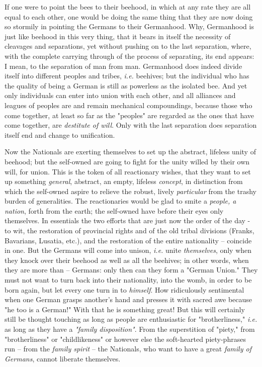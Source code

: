 \documentclass[a4paper]{book}
\begin{document}
If one were to point the bees to their beehood, in which at any rate they are 
all equal to each other, one would be doing the same thing that they are now 
doing so stormily in pointing the Germans to their Germanhood. Why, Germanhood 
is just like beehood in this very thing, that it bears in itself the necessity 
of cleavages and separations, yet without pushing on to the last separation, 
where, with the complete carrying through of the process of separating, its 
end appears: I mean, to the separation of man from man. Germanhood does indeed 
divide itself into different peoples and tribes, \textit{i.e.} beehives; but 
the individual who has the quality of being a German is still as powerless as 
the isolated bee. And yet only individuals can enter into union with each 
other, and all alliances and leagues of peoples are and remain mechanical 
compoundings, because those who come together, at least so far as the 
"{}peoples"{} are regarded as the ones that have come together, are 
\textit{destitute of will}. Only with the last separation does separation 
itself end and change to unification.

Now the Nationals are exerting themselves to set up the abstract, lifeless 
unity of beehood; but the self-owned are going to fight for the unity willed 
by their own will, for union. This is the token of all reactionary wishes, 
that they want to set up something \textit{general}, abstract, an empty, 
lifeless \textit{concept}, in distinction from which the self-owned aspire to 
relieve the robust, lively \textit{particular} from the trashy burden of 
generalities. The reactionaries would be glad to smite a \textit{people, a 
nation}, forth from the earth; the self-owned have before their eyes only 
themselves. In essentials the two efforts that are just now the order of the 
day - to wit, the restoration of provincial rights and of the old tribal 
divisions (Franks, Bavarians, Lusatia, etc.), and the restoration of the 
entire nationality -- coincide in one. But the Germans will come into unison, 
\textit{i.e.} unite \textit{themselves}, only when they knock over their 
beehood as well as all the beehives; in other words, when they are more than 
-- Germans: only then can they form a "{}German Union."{} They must not want 
to turn back into their nationality, into the womb, in order to be born again, 
but let every one turn in to \textit{himself}. How ridiculously sentimental 
when one German grasps another's hand and presses it with sacred awe because 
"{}he too is a German!"{} With that he is something great! But this will 
certainly still be thought touching as long as people are enthusiastic for 
"{}brotherliness,"{} \textit{i.e.} as long as they have a \textit{"{}family 
disposition"{}}. From the superstition of "{}piety,"{} from 
"{}brotherliness"{} or "{}childlikeness"{} or however else the soft-hearted 
piety-phrases run -- from the \textit{family spirit} -- the Nationals, who 
want to have a great \textit{family of Germans}, cannot liberate themselves.
\end{document}
